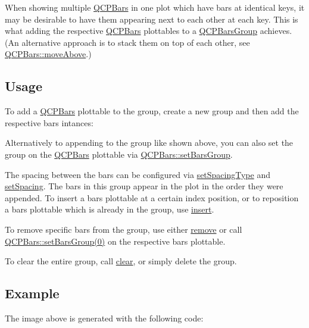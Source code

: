 When showing multiple \hyperlink{class_q_c_p_bars}{Q\+C\+P\+Bars} in one plot which have bars at identical keys, it may be desirable to have them appearing next to each other at each key. This is what adding the respective \hyperlink{class_q_c_p_bars}{Q\+C\+P\+Bars} plottables to a \hyperlink{class_q_c_p_bars_group}{Q\+C\+P\+Bars\+Group} achieves. (An alternative approach is to stack them on top of each other, see \hyperlink{class_q_c_p_bars_ac22e00a6a41509538c21b04f0a57318c}{Q\+C\+P\+Bars\+::move\+Above}.)\hypertarget{class_q_c_p_bars_group_qcpbarsgroup-usage}{}\subsection{Usage}\label{class_q_c_p_bars_group_qcpbarsgroup-usage}
To add a \hyperlink{class_q_c_p_bars}{Q\+C\+P\+Bars} plottable to the group, create a new group and then add the respective bars intances\+: 
\begin{DoxyCodeInclude}
\end{DoxyCodeInclude}
Alternatively to appending to the group like shown above, you can also set the group on the \hyperlink{class_q_c_p_bars}{Q\+C\+P\+Bars} plottable via \hyperlink{class_q_c_p_bars_aedd1709061f0b307c47ddb45e172ef9a}{Q\+C\+P\+Bars\+::set\+Bars\+Group}.

The spacing between the bars can be configured via \hyperlink{class_q_c_p_bars_group_a2c7e2d61b10594a4555b615e1fcaf49e}{set\+Spacing\+Type} and \hyperlink{class_q_c_p_bars_group_aa553d327479d72a0c3dafcc724a190e2}{set\+Spacing}. The bars in this group appear in the plot in the order they were appended. To insert a bars plottable at a certain index position, or to reposition a bars plottable which is already in the group, use \hyperlink{class_q_c_p_bars_group_a309a5f7233db189f3ea9c2d04ece6c13}{insert}.

To remove specific bars from the group, use either \hyperlink{class_q_c_p_bars_group_a215e28a5944f1159013a0e19169220e7}{remove} or call \hyperlink{class_q_c_p_bars_aedd1709061f0b307c47ddb45e172ef9a}{Q\+C\+P\+Bars\+:\+:set\+Bars\+Group(0)} on the respective bars plottable.

To clear the entire group, call \hyperlink{class_q_c_p_bars_group_a3ddf23928c6cd89530bd34ab7ba7b177}{clear}, or simply delete the group.\hypertarget{class_q_c_p_bars_group_qcpbarsgroup-example}{}\subsection{Example}\label{class_q_c_p_bars_group_qcpbarsgroup-example}
The image above is generated with the following code\+: 
\begin{DoxyCodeInclude}
\end{DoxyCodeInclude}


